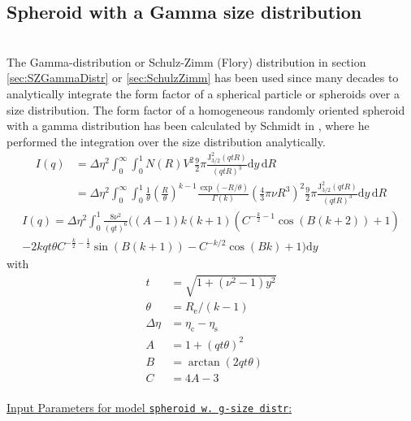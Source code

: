 \subsection{Spheroid with a Gamma size distribution}
\label{sec:SpheroidSZdistr}~\\
The Gamma-distribution or Schulz-Zimm (Flory) distribution in section \ref{sec:SZGammaDistr} or \ref{sec:SchulzZimm} has been used since many decades \cite{Schmidt1958,Aragon1976,Schmidt1984,Bartlett1992,Heinemann2000,Wagner2004,Forster2005} to analytically integrate the form factor of a spherical particle or spheroids over a size distribution. The form factor of a homogeneous randomly oriented spheroid with a gamma distribution has been calculated by Schmidt in \cite{Schmidt1958}, where he performed the integration over the size distribution analytically.
\begin{align}\label{eq:spherid_start}
  I(q) &= \Delta\eta^2 \int_0^\infty\int_0^1 N(R) V^2 \frac92\pi\frac{\mathrm{J}_{3/2}^2(qtR)}{(qtR)^3} \mathrm{d}y \, \mathrm{d}R\\
       &= \Delta\eta^2 \int_0^\infty\int_0^1 \frac{1}{\theta}
\left(\frac{R}{\theta}\right)^{k-1}
\frac{\exp(-R/\theta)}{\Gamma(k)} \left(\frac{4}{3}\pi\nu R^3\right)^2 \frac92\pi\frac{\mathrm{J}_{3/2}^2(qtR)}{(qtR)^3} \mathrm{d}y \, \mathrm{d}R
\end{align}
\begin{multline}
\label{eq:spheroid_GD}
  I(q) = \Delta\eta^2 \int_0^1 \frac{8\nu^2}{(qt)^6} \Bigg((A-1) k (k+1)  \left(C^{-\frac{k}{2}-1} \cos (B (k+2))+1\right) \\
                           -2 k qt\theta C^{-\frac{k}{2}-\frac{1}{2}} \sin (B(k+1))-C^{-k/2} \cos (B k)+1\Bigg) \mathrm{d}y
\end{multline}
with
\begin{align}\label{eq:spheroid_tABC}
  t &= \sqrt{1+\left(\nu^2-1\right)y^2}\\
  \theta &= R_\mathrm{e}/(k-1)\\
  \Delta\eta&=\eta_\mathrm{c}-\eta_\mathrm{s}\\
  A &= 1+(qt\theta)^2\\
  B &= \arctan\left(2qt\theta\right)\\
  C &=4A-3
\end{align}
~\\
\uline{Input Parameters for model \texttt{spheroid w. g-size distr}:}
